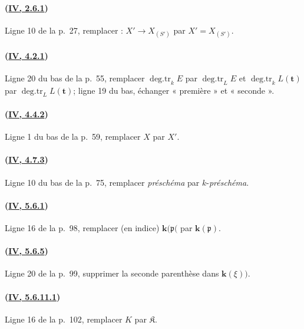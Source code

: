 \paragraph{({\texorpdfstring{\protect\hyperref[canon-index.ega4.c04.prop.2-6-1]{IV, 2.6.1}}{IV, 2.6.1}})}
Ligne 10 de la p.~27, remplacer : $X'\to X_{(S')}$ par
$X'=X_{(S')}$. 

\paragraph{({\texorpdfstring{\protect\hyperref[canon-index.ega4.c04.prop.4-2-1]{IV, 4.2.1}}{IV, 4.2.1}})}
Ligne 20 du bas de la p.~55, remplacer
$\operatorname{deg.tr}_kE$ par $\operatorname{deg.tr}_LE$ et
$\operatorname{deg.tr}_kL(\mathbf{t})$ par $\operatorname{deg.tr}_LL(\mathbf{t})$;
ligne 19 du bas, échanger « première » et « seconde ».

\paragraph{({\texorpdfstring{\protect\hyperref[canon-index.ega4.c04.lem.4-4-2]{IV, 4.4.2}}{IV, 4.4.2}})}
Ligne 1 du bas de la p.~59, remplacer $X$ par $X'$.

\paragraph{({\texorpdfstring{\protect\hyperref[canon-index.ega4.c04.prop.4-7-3]{IV, 4.7.3}}{IV, 4.7.3}})}
Ligne 10 du bas de la p.~75, remplacer \emph{préschéma} par $k$-\emph{préschéma}.

\paragraph{({\texorpdfstring{\protect\hyperref[canon-index.ega4.c04.prop.5-6-1]{IV, 5.6.1}}{IV, 5.6.1}})}
Ligne 16 de la p.~98, remplacer (en indice) $\boldsymbol{k}(\mathfrak p($ par
$\boldsymbol{k}(\mathfrak p)$.

\paragraph{({\texorpdfstring{\protect\hyperref[canon-index.ega4.c04.prop.5-6-5]{IV, 5.6.5}}{IV, 5.6.5}})}
Ligne 20 de la p.~99, supprimer la seconde parenthèse dans $\boldsymbol{k}(\xi))$.

\paragraph{({\texorpdfstring{\protect\hyperref[canon-index.ega4.c04.lem.5-6-11-1]{IV, 5.6.11.1}}{IV, 5.6.11.1}})}
Ligne 16 de la p.~102, remplacer $K$ par $\mathfrak K$.

